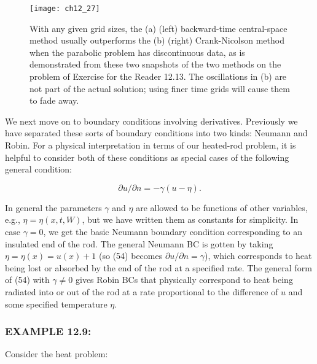 \documentclass[../main.tex]{subfiles}
\begin{document}
\begin{figure}[H]
	\centering
	\texttt{[image: ch12\_27]}
	\caption{\textsf{With any given grid sizes, the (a) (left) backward-time central-space method usually outperforms the (b) (right) Crank-Nicolson method when the parabolic problem has discontinuous data, as is demonstrated from these two snapshots of the two methods on the problem of Exercise for the Reader 12.13. The oscillations in (b) are not part of the actual solution; using finer time grids will cause them to fade away.}}
	\label{pfig:ch12_27}
\end{figure}
We next move on to boundary conditions involving derivatives. Previously we have separated these sorts of boundary conditions into two kinds: Neumann and Robin. For a physical interpretation in terms of our heated-rod problem, it is helpful to consider both of these conditions as special cases of the following general condition: 

\begin{equation}
\partial u/\partial n= -\gamma(u-\eta).
\end{equation}

In general the parameters $\gamma$ and $\eta$ are allowed to be functions of other variables, e.g., $\eta = \eta(x,t,W)$, but we have written them as constants for simplicity. In case $\gamma = 0$, we get the basic Neumann boundary condition corresponding to an insulated end of the rod. The general Neumann BC is gotten by taking  $\eta= \eta(x) = u(x) +1$ (so (54) becomes $\partial u/\partial n= \gamma$), which corresponds to heat being lost or absorbed by the end of the rod at a specified rate. The general form of (54) with $\gamma \neq 0$ gives Robin BCs that physically correspond to heat being radiated into or out of the rod at a rate proportional to the difference of $u$ and some specified temperature $\eta$.

\subsubsection{EXAMPLE 12.9:}
Consider the heat problem:
\end{document}

